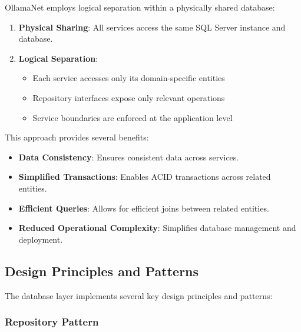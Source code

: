 OllamaNet employs logical separation within a physically shared database:

\begin{enumerate}
   \item \textbf{Physical Sharing}: All services access the same SQL Server instance and database.

   \item \textbf{Logical Separation}:
   \begin{itemize}
      \item Each service accesses only its domain-specific entities
      \item Repository interfaces expose only relevant operations
      \item Service boundaries are enforced at the application level
   \end{itemize}
\end{enumerate}

This approach provides several benefits:

\begin{itemize}
   \item \textbf{Data Consistency}: Ensures consistent data across services.
   \item \textbf{Simplified Transactions}: Enables ACID transactions across related entities.
   \item \textbf{Efficient Queries}: Allows for efficient joins between related entities.
   \item \textbf{Reduced Operational Complexity}: Simplifies database management and deployment.
\end{itemize}


\subsection{Design Principles and Patterns}

The database layer implements several key design principles and patterns:

\subsubsection*{Repository Pattern}

